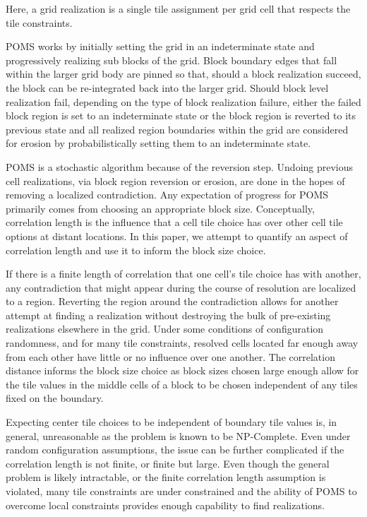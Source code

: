 Here, a grid realization is a single tile assignment per grid cell that respects the
tile constraints.

POMS works by initially setting the grid in an indeterminate state and progressively realizing
sub blocks of the grid.
Block boundary edges that fall within the larger grid body are pinned so that, should a
block realization succeed, the block can be re-integrated back into the larger grid.
Should block level realization fail, depending on the type of block realization failure,
either the failed block region is set to an indeterminate state
or the block region is reverted to its previous state and all realized region boundaries within the grid
are considered for erosion by probabilistically
setting them to an indeterminate state.

POMS is a stochastic algorithm because of the reversion step.
Undoing previous cell realizations, via
block region reversion or erosion, are done in the hopes of
removing a localized contradiction.
Any expectation of progress for POMS primarily comes from choosing an
appropriate block size.
Conceptually, correlation length is the influence that a cell tile choice
has over other cell tile options at distant locations.
In this paper, we attempt to quantify an aspect of correlation length and use it
to inform the block size choice.

If there is a finite length of correlation that one cell's tile choice has with another,
any contradiction that might appear during the course of resolution are localized to a region.
Reverting the region around the contradiction allows for another attempt at finding a
realization without destroying
the bulk of pre-existing realizations elsewhere in the grid.
Under some conditions of configuration randomness, and for many tile constraints,
resolved cells located far enough away from each other have little or no influence over one another.
The correlation distance informs the block size choice as block sizes chosen large enough allow
for the tile values in the middle cells of a block to be chosen independent of any tiles fixed on the boundary.

Expecting center tile choices to be independent of boundary tile values is, in general, unreasonable as
the problem is known to be NP-Complete.
Even under random configuration assumptions, the issue can be further complicated if the correlation length is not
finite, or finite but large.
Even though the general problem is likely intractable, or the finite correlation length assumption is
violated, many tile constraints are under constrained and the ability of POMS to overcome local constraints
provides enough capability to find realizations.

